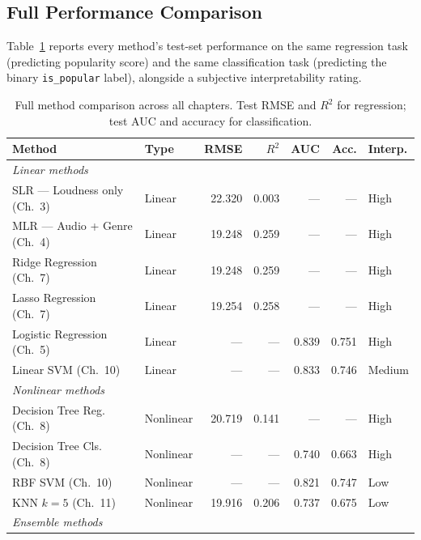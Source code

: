 \documentclass[12pt, oneside]{book}
\begin{document}
\subsection{Full Performance Comparison}
 
Table~\ref{tab:ch14_comparison} reports every method's test-set performance on the same regression task (predicting popularity score) and the same classification task (predicting the binary \texttt{is\_popular} label), alongside a subjective interpretability rating.
 
\begin{table}[H]
\centering
\caption{Full method comparison across all chapters. Test RMSE and $R^2$ for regression; test AUC and accuracy for classification.}
\label{tab:ch14_comparison}
\small
\begin{tabular}{llrrrrl}
\toprule
\textbf{Method} & \textbf{Type} & \textbf{RMSE} & \textbf{$R^2$} & \textbf{AUC} & \textbf{Acc.} & \textbf{Interp.} \\
\midrule
\multicolumn{7}{l}{\textit{Linear methods}} \\
SLR --- Loudness only (Ch.\ 3)     & Linear  & 22.320 & 0.003 & ---   & ---   & High \\
MLR --- Audio + Genre (Ch.\ 4)     & Linear  & 19.248 & 0.259 & ---   & ---   & High \\
Ridge Regression (Ch.\ 7)          & Linear  & 19.248 & 0.259 & ---   & ---   & High \\
Lasso Regression (Ch.\ 7)          & Linear  & 19.254 & 0.258 & ---   & ---   & High \\
Logistic Regression (Ch.\ 5)       & Linear  & ---    & ---   & 0.839 & 0.751 & High \\
Linear SVM (Ch.\ 10)               & Linear  & ---    & ---   & 0.833 & 0.746 & Medium \\
\midrule
\multicolumn{7}{l}{\textit{Nonlinear methods}} \\
Decision Tree Reg. (Ch.\ 8)        & Nonlinear & 20.719 & 0.141 & ---   & ---   & High \\
Decision Tree Cls. (Ch.\ 8)        & Nonlinear & ---    & ---   & 0.740 & 0.663 & High \\
RBF SVM (Ch.\ 10)                  & Nonlinear & ---    & ---   & 0.821 & 0.747 & Low  \\
KNN $k=5$ (Ch.\ 11)                & Nonlinear & 19.916 & 0.206 & 0.737 & 0.675 & Low  \\
\midrule
\multicolumn{7}{l}{\textit{Ensemble methods}} \\

\end{tabular}
\end{table}
\end{document}
